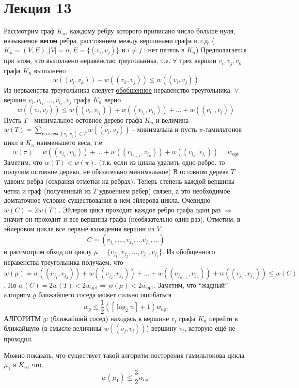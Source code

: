 \documentclass{article}
\numberwithin{example}{section}
\numberwithin{question}{section}
\numberwithin{Remark}{section}
\numberwithin{theorem}{section}
\numberwithin{definition}{section}
\numberwithin{proposition}{section}
\begin{document}
\section{Лекция 13}
Рассмотрим граф $K_n$, каждому ребру которого приписано число больше нуля, называемое \textbf{весом} ребра, расстоянием между вершинами графа и.т.д. ($K_n=(V,E),|V|=n,E=\{(v_i,v_j) \}$ и $i\ne j$ : нет петель в $K_n$) Предполагается при этом, что выполнено неравенство треугольника, т.е. $\forall$ трех вершин $v_i,v_j,v_k$ графа $K_n$ выполнено
\begin{equation*}
w((v_i,v_k))+w((v_k,v_j))\leqslant w((v_i,v_j))
\end{equation*}
Из нерваенства треугольника следует \underline{обобщенное} неравенство треугольника: $\forall$ вершин $v_i,v_{i_1},\ldots,v_{i_n},v_j$ графа $K_n$ верно
\begin{equation*}
w((v_i,v_j))\leqslant w((v_{i},v_{i_1}))+w((v_{i_1},v_{i_2}))+\ldots+w((v_{i_n},v_{j}))
\end{equation*}
Пусть $T$ - минимальное остовное дерево графа $K_n$ и величина $w(T)=\sum\limits_{\text{по всем }(v_i,v_j)\in T} w((v_i,v_j))$ - минимальна и пусть $\pi$-гамильтонов цикл в $K_n$ наименьшего веса, т.е.
\begin{equation*}
w(\pi)=w((v_{i_1},v_{i_2}))+\ldots+w((v_{i_{n-1}},v_{i_n}))+w((v_{i_n},v_{i_1}))=w_{\text{opt}}
\end{equation*}
Заметим, что $w(T)<w(\pi)$. (т.к. если из цикла удалить одно ребро, то получим остовное дерево, не обязательно минимальное) В остовном дереве $T$ удвоим ребра (сохраняя отметки на ребрах). Теперь степень каждой вершины четна и граф (полученный из $T$ удвоением ребер) связен, а это необходимое домтаточное условие существования в нем эйлерова цикла. Очевидно $w(C)=2w(T)$. Эйлеров цикл проходит каждое ребро графа один раз $\Rightarrow$ значит он проходит и все вершины графа (необязательно один раз). Отметим, в эйлеровом цикле все первые вхождения вершин из $V$.
\begin{equation*}
C=(v_{j_1},\ldots, v_{j_2},\ldots v_{j_n},\ldots)
\end{equation*}
и рассмотрим обход по циклу $\mu=\{v_{j_1},v_{j_2},\ldots,v_{j_n},v_{j_1} \}$. Из обобщенного неравенства треугольника получаем, что $w(\mu)=w((v_{j_1},v_{j_2}))+w((v_{j_2},v_{j_3}))+\ldots+w((v_{j_{n-1}},v_{j_n}))+w((v_{j_n},v_{j_1}))\leqslant w(C)$. Но $w(C)=2w(T)<2w_{\text{opt}}\Rightarrow w(\mu)< 2w_{\text{opt}}$. Заметим, что ``жадный'' алгоритм $g$ ближайшего соседа может сильно ошибаться
\begin{equation*}
w_g \leqslant\frac{1}{2}\left([\log_2 n]+1 \right) w_{\text{opt}}
\end{equation*}
АЛГОРИТМ $g$: (ближайший сосед) находясь в вершине $v_j$ графа $K_n$ перейти в ближайщую (в смысле величины $w((v_j,v_i))$) вершину $v_i$, которую ещё не проходил. 

Можно показать, что существует такой алгоритм посторения гамильтонова цикла $\mu_1$ в $K_n$, что 
\begin{equation*}
w(\mu_1)\leqslant \frac{3}{2} w_{\text{opt}}
\end{equation*} 
\end{document}
